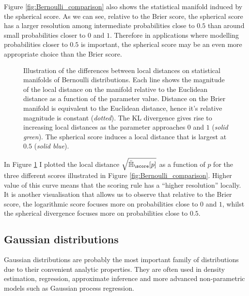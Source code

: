 Figure \ref{fig:Bernoulli_comparison} also shows the statistical manifold induced by the spherical score. As we can see, relative to the Brier score, the spherical score has a larger resolution among intermediate probabilities close to $0.5$ than around small probabilities closer to $0$ and $1$. Therefore in applications where modelling probabilities closer to $0.5$ is important, the spherical score may be an even more appropriate choice than the Brier score.

\begin{figure}[t]
	\begin{center}
	\end{center}
	\caption[Local distances on the statistical manifold of Bernoulli distributions]{Illustration of the differences between local distances on statistical manifolds of Bernoulli distributions. Each line shows the magnitude of the local distance on the manifold relative to the Euclidean distance as a function of the parameter value. Distance on the Brier manifold is equivalent to the Euclidean distance, hence it's relative magnitude is constant (\emph{dotted}). The KL divergence gives rise to increasing local distances as the parameter approaches $0$ and $1$ (\emph{solid green}). The spherical score induces a local distance that is largest at $0.5$ (\emph{solid blue}).\label{fig:Bernoulli_squareddistance}}
\end{figure}

In Figure \ref{fig:Bernoulli_squareddistance} I plotted the local distance $\sqrt{\ddot{\mathbb{H}}_{\score}[p]}$ as a function of $p$ for the three different scores illustrated in Figure \ref{fig:Bernoulli_comparison}. Higher value of this curve means that the scoring rule has a ``higher resolution'' locally. It is another visualisation that allows us to observe that relative to the Brier score, the logarithmic score focuses more on probabilities close to $0$ and $1$, whilst the spherical divergence focuses more on probabilities close to $0.5$.

\subsection{Gaussian distributions}

Gaussian distributions are probably the most important family of distributions due to their convenient analytic properties. They are often used in density estimation, regression, approximate inference and more advanced non-parametric models such as Gaussian process regression.

